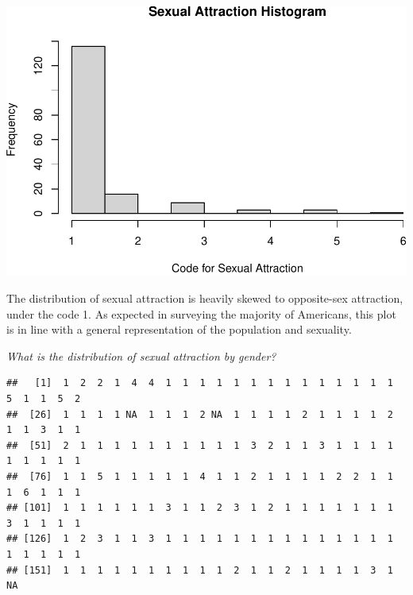 \documentclass[
]{article}
\newenvironment{Shaded}{\begin{snugshade}}{\end{snugshade}}
\newcommand{\AttributeTok}[1]{\textcolor[rgb]{0.77,0.63,0.00}{#1}}
\newcommand{\CommentTok}[1]{\textcolor[rgb]{0.56,0.35,0.01}{\textit{#1}}}
\newcommand{\ConstantTok}[1]{\textcolor[rgb]{0.00,0.00,0.00}{#1}}
\newcommand{\FunctionTok}[1]{\textcolor[rgb]{0.00,0.00,0.00}{#1}}
\newcommand{\NormalTok}[1]{#1}
\newcommand{\OtherTok}[1]{\textcolor[rgb]{0.56,0.35,0.01}{#1}}
\newcommand{\SpecialCharTok}[1]{\textcolor[rgb]{0.00,0.00,0.00}{#1}}
\newcommand{\StringTok}[1]{\textcolor[rgb]{0.31,0.60,0.02}{#1}}
\begin{document}
\includegraphics{Journal_files/figure-latex/unnamed-chunk-17-1.pdf}

The distribution of sexual attraction is heavily skewed to opposite-sex
attraction, under the code 1. As expected in surveying the majority of
Americans, this plot is in line with a general representation of the
population and sexuality.

\emph{What is the distribution of sexual attraction by gender?}

\begin{Shaded}
\end{Shaded}

\begin{verbatim}
##   [1]  1  2  2  1  4  4  1  1  1  1  1  1  1  1  1  1  1  1  1  1  5  1  1  5  2
##  [26]  1  1  1  1 NA  1  1  1  2 NA  1  1  1  1  2  1  1  1  1  2  1  1  3  1  1
##  [51]  2  1  1  1  1  1  1  1  1  1  1  3  2  1  1  3  1  1  1  1  1  1  1  1  1
##  [76]  1  1  5  1  1  1  1  1  4  1  1  2  1  1  1  1  2  2  1  1  1  6  1  1  1
## [101]  1  1  1  1  1  1  3  1  1  2  3  1  2  1  1  1  1  1  1  1  3  1  1  1  1
## [126]  1  2  3  1  1  3  1  1  1  1  1  1  1  1  1  1  1  1  1  1  1  1  1  1  1
## [151]  1  1  1  1  1  1  1  1  1  1  2  1  1  2  1  1  1  1  3  1 NA
\end{verbatim}

\begin{Shaded}
\end{Shaded}
\end{document}
